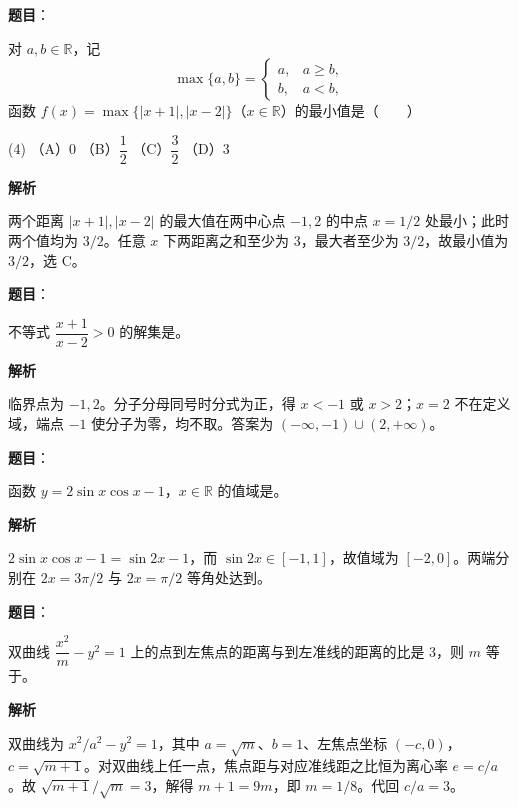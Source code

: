 \begin{answer}

\textbf{题目}：

对 $a,b\in\mathbb R$，记
\nopagebreak[4]
\[
\max\{a,b\}=\begin{cases}a,&a\geqslant b,\\b,&a<b,\end{cases}
\]
函数 $f(x)=\max\{|x+1|,|x-2|\}$（$x\in\mathbb R$）的最小值是\mbox{（　　）}

\begin{gkopts}(4)
\task （A）$0$
\task （B）$\dfrac12$
\task （C）$\dfrac32$
\task （D）$3$
\end{gkopts}

\textbf{解析}

两个距离 $|x+1|,|x-2|$ 的最大值在两中心点 $-1,2$ 的中点 $x=1/2$ 处最小；此时两个值均为 $3/2$。任意 $x$ 下两距离之和至少为 $3$，最大者至少为 $3/2$，故最小值为 $3/2$，选 C。


\end{answer}
\begin{answer}

\textbf{题目}：

不等式 $\dfrac{x+1}{x-2}>0$ 的解集是\gkblank{}。

\textbf{解析}

临界点为 $-1,2$。分子分母同号时分式为正，得 $x<-1$ 或 $x>2$；$x=2$ 不在定义域，端点 $-1$ 使分子为零，均不取。答案为 $(-\infty,-1)\cup(2,+\infty)$。


\end{answer}
\begin{answer}

\textbf{题目}：

函数 $y=2\sin x\cos x-1$，$x\in\mathbb R$ 的值域是\gkblank{}。

\textbf{解析}

$2\sin x\cos x-1=\sin 2x-1$，而 $\sin2x\in[-1,1]$，故值域为 $[-2,0]$。两端分别在 $2x=3\pi/2$ 与 $2x=\pi/2$ 等角处达到。


\end{answer}
\begin{answer}

\textbf{题目}：

双曲线 $\dfrac{x^2}{m}-y^2=1$ 上的点到左焦点的距离与到左准线的距离的比是 $3$，则 $m$ 等于\gkblank{}。

\textbf{解析}

双曲线为 $x^2/a^2-y^2=1$，其中 $a=\sqrt m$、$b=1$、左焦点坐标 $(-c,0)$，$c=\sqrt{m+1}$。对双曲线上任一点，焦点距与对应准线距之比恒为离心率 $e=c/a$。故 $\sqrt{m+1}/\sqrt m=3$，解得 $m+1=9m$，即 $m=1/8$。代回 $c/a=3$。


\end{answer}
